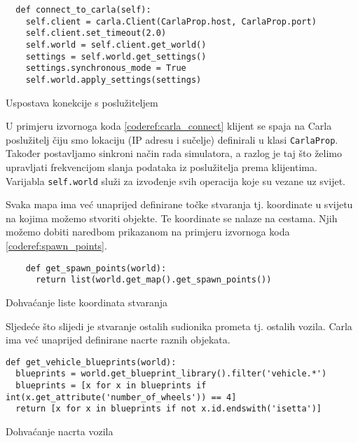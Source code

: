 \begin{listing}[!ht]
  \begin{verbatim}
  def connect_to_carla(self):
    self.client = carla.Client(CarlaProp.host, CarlaProp.port)
    self.client.set_timeout(2.0)
    self.world = self.client.get_world()
    settings = self.world.get_settings()
    settings.synchronous_mode = True
    self.world.apply_settings(settings)
  \end{verbatim}
  \caption{Uspostava konekcije s poslužiteljem}
  \label{coderef:carla_connect}
\end{listing}

U primjeru izvornoga koda \ref{coderef:carla_connect} klijent se spaja na Carla poslužitelj čiju smo lokaciju (IP adresu i sučelje) definirali u klasi \texttt{CarlaProp}. Također postavljamo sinkroni način rada simulatora, a razlog je taj što želimo upravljati frekvencijom slanja podataka iz poslužitelja prema klijentima. Varijabla \texttt{self.world} služi za izvođenje svih operacija koje su vezane uz svijet.

Svaka mapa ima već unaprijed definirane točke stvaranja tj. koordinate u svijetu na kojima možemo stvoriti objekte. Te koordinate se nalaze na cestama. Njih možemo dobiti naredbom prikazanom na primjeru izvornoga koda \ref{coderef:spawn_points}. 

\begin{listing}[!ht]
  \begin{verbatim}
    def get_spawn_points(world):
      return list(world.get_map().get_spawn_points())
  \end{verbatim}
  \caption{Dohvaćanje liste koordinata stvaranja}
  \label{coderef:spawn_points}
\end{listing}

Sljedeće što slijedi je stvaranje ostalih sudionika prometa tj. ostalih vozila. Carla ima već unaprijed definirane nacrte raznih objekata.

\begin{listing}[!ht]
  \begin{verbatim}
def get_vehicle_blueprints(world):
  blueprints = world.get_blueprint_library().filter('vehicle.*')
  blueprints = [x for x in blueprints if int(x.get_attribute('number_of_wheels')) == 4]
  return [x for x in blueprints if not x.id.endswith('isetta')]
  \end{verbatim}
  \caption{Dohvaćanje nacrta vozila}
  \label{coderef:vehicle_blueprints}
\end{listing}

